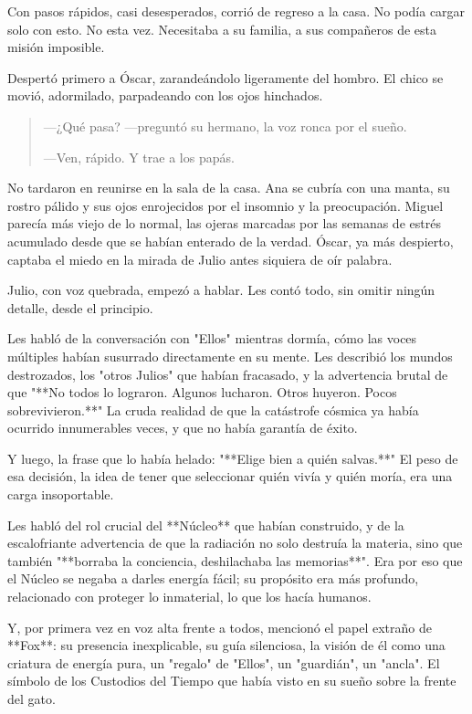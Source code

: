 \documentclass[a4paper,12pt]{book}
\begin{document}
Con pasos rápidos, casi desesperados, corrió de regreso a la casa. No podía cargar solo con esto. No esta vez. Necesitaba a su familia, a sus compañeros de esta misión imposible.

Despertó primero a Óscar, zarandeándolo ligeramente del hombro. El chico se movió, adormilado, parpadeando con los ojos hinchados.

\begin{quote}
    —¿Qué pasa? —preguntó su hermano, la voz ronca por el sueño.

    —Ven, rápido. Y trae a los papás.
\end{quote}

No tardaron en reunirse en la sala de la casa. Ana se cubría con una manta, su rostro pálido y sus ojos enrojecidos por el insomnio y la preocupación. Miguel parecía más viejo de lo normal, las ojeras marcadas por las semanas de estrés acumulado desde que se habían enterado de la verdad. Óscar, ya más despierto, captaba el miedo en la mirada de Julio antes siquiera de oír palabra.

Julio, con voz quebrada, empezó a hablar. Les contó todo, sin omitir ningún detalle, desde el principio.

Les habló de la conversación con "Ellos" mientras dormía, cómo las voces múltiples habían susurrado directamente en su mente. Les describió los mundos destrozados, los "otros Julios" que habían fracasado, y la advertencia brutal de que "**No todos lo lograron. Algunos lucharon. Otros huyeron. Pocos sobrevivieron.**" La cruda realidad de que la catástrofe cósmica ya había ocurrido innumerables veces, y que no había garantía de éxito.

Y luego, la frase que lo había helado: "**Elige bien a quién salvas.**" El peso de esa decisión, la idea de tener que seleccionar quién vivía y quién moría, era una carga insoportable.

Les habló del rol crucial del **Núcleo** que habían construido, y de la escalofriante advertencia de que la radiación no solo destruía la materia, sino que también "**borraba la conciencia, deshilachaba las memorias**". Era por eso que el Núcleo se negaba a darles energía fácil; su propósito era más profundo, relacionado con proteger lo inmaterial, lo que los hacía humanos.

Y, por primera vez en voz alta frente a todos, mencionó el papel extraño de **Fox**: su presencia inexplicable, su guía silenciosa, la visión de él como una criatura de energía pura, un "regalo" de "Ellos", un "guardián", un "ancla". El símbolo de los Custodios del Tiempo que había visto en su sueño sobre la frente del gato.
\end{document}
